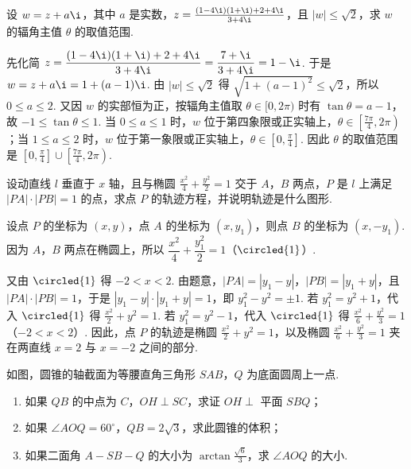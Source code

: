 \documentclass[UTF8,a4paper,oneside,11pt]{ctexbook}
\begin{document}
\begin{problem}
设 \(w = z + a\i\)，其中 \(a\) 是实数，\(z = \frac{(1 - 4\i)(1 + \i) + 2 + 4\i}{3 + 4\i}\)，且 \(|w| \leqslant \sqrt{2}\)，求 \(w\) 的辐角主值 \(\theta\) 的取值范围.
\end{problem}

\begin{solution}
先化简 \(z = \dfrac{(1 - 4\i)(1 + \i) + 2 + 4\i}{3 + 4\i}
= \dfrac{7 + \i}{3 + 4\i}
= 1 - \i\).
于是 \(w = z + a\i = 1 + (a - 1)\i\). 由 \(|w| \leqslant \sqrt{2}\) 得 \(\sqrt{1 + (a - 1)^2} \leqslant \sqrt{2}\)，所以 \(0 \leqslant a \leqslant 2\). 又因 \(w\) 的实部恒为正，按辐角主值取 \(\theta\in[0,2\pi)\) 时有 \(\tan\theta=a-1\)，故 \(-1\leqslant\tan\theta\leqslant1\). 当 \(0\leqslant a\leqslant1\) 时，\(w\) 位于第四象限或正实轴上，\(\theta\in\left[\frac{7\pi}{4},2\pi\right)\)；当 \(1\leqslant a\leqslant2\) 时，\(w\) 位于第一象限或正实轴上，\(\theta\in\left[0,\frac{\pi}{4}\right]\). 因此 \(\theta\) 的取值范围是 \(\left[0,\frac{\pi}{4}\right] \cup \left[\frac{7\pi}{4},2\pi\right)\).
\end{solution}

\begin{problem}
设动直线 \(l\) 垂直于 \(x\) 轴，且与椭圆 \(\frac{x^2}{4} + \frac{y^2}{2} = 1\) 交于 \(A\)，\(B\) 两点，\(P\) 是 \(l\) 上满足 \(|PA| \cdot |PB| = 1\) 的点，求点 \(P\) 的轨迹方程，并说明轨迹是什么图形.
\end{problem}

\begin{solution}
设点 \(P\) 的坐标为 \((x,y)\)，点 \(A\) 的坐标为 \((x,y_1)\)，则点 \(B\) 的坐标为 \((x,-y_1)\). 因为 \(A\)，\(B\) 两点在椭圆上，所以 \(\dfrac{x^2}{4} + \dfrac{y_1^2}{2} = 1\)（\(\circled{1}\)）.

又由 \(\circled{1}\) 得 \(-2 < x < 2\). 由题意，\(|PA| = |y_1 - y|\)，\(|PB| = |y_1 + y|\)，且 \(|PA|\cdot|PB| = 1\)，于是 \(|y_1 - y|\cdot|y_1 + y| = 1\)，即 \(y_1^2 - y^2 = \pm 1\). 若 \(y_1^2 = y^2 + 1\)，代入 \(\circled{1}\) 得 \(\frac{x^2}{2} + y^2 = 1\). 若 \(y_1^2 = y^2 - 1\)，代入 \(\circled{1}\) 得 \(\frac{x^2}{6} + \frac{y^2}{3} = 1\)（\(-2 < x < 2\)）. 因此，点 \(P\) 的轨迹是椭圆 \(\frac{x^2}{2} + y^2 = 1\)，以及椭圆 \(\frac{x^2}{6} + \frac{y^2}{3} = 1\) 夹在两直线 \(x = 2\) 与 \(x = -2\) 之间的部分.
\end{solution}

\begin{problem}
如图，圆锥的轴截面为等腰直角三角形 \(SAB\)，\(Q\) 为底面圆周上一点.

\begin{enumerate}
\item 如果 \(QB\) 的中点为 \(C\)，\(OH \perp SC\)，求证 \(OH \perp\) 平面 \(SBQ\)；
\item 如果 \(\angle AOQ = 60^{\circ}\)，\(QB = 2\sqrt{3}\)，求此圆锥的体积；
\item 如果二面角 \(A-SB-Q\) 的大小为 \(\arctan \frac{\sqrt{6}}{3}\)，求 \(\angle AOQ\) 的大小.
\end{enumerate}

\end{problem}
\end{document}
